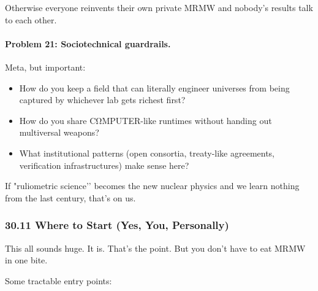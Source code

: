 Otherwise everyone reinvents their own private MRMW and nobody’s results talk to each other.

\paragraph{Problem 21: Sociotechnical guardrails.}

Meta, but important:

\begin{itemize}
  \item How do you keep a field that can literally engineer universes from being captured by whichever lab gets richest first?
  \item How do you share CΩMPUTER-like runtimes without handing out multiversal weapons?
  \item What institutional patterns (open consortia, treaty-like agreements, verification infrastructures) make sense here?
\end{itemize}

If "ruliometric science’’ becomes the new nuclear physics and we learn nothing from the last century, that’s on us.

\subsubsection*{30.11  Where to Start (Yes, You, Personally)}

This all sounds huge. It is. That’s the point.
But you don’t have to eat MRMW in one bite.

Some tractable entry points:

